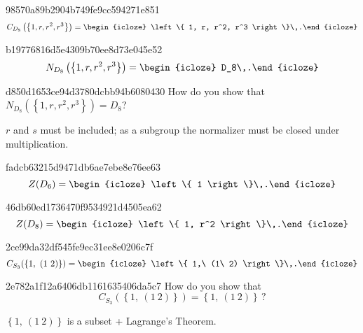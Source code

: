 \begin{note}{98570a89b2904b749fe9cc594271e851}
    \[
        C_{D_8}\left( \left\{ 1, r, r^2, r^3 \right\} \right) = \begin{icloze}{1}\left\{ 1, r, r^2, r^3 \right\}\,.\end{icloze}
    \]
\end{note}

\begin{note}{b19776816d5e4309b70ee8d73e045e52}
    \[
        N_{D_8}\left( \left\{ 1, r, r^2, r^3 \right\} \right) = \begin{icloze}{1}D_8\,.\end{icloze}
    \]
\end{note}

\begin{note}{d850d1653ce94d3780dcbb94b6080430}
    How do you show that \({ N_{D_8}\left( \left\{ 1, r, r^2, r^3 \right\} \right) = D_8 }\)?

    \begin{cloze}{1}
        \({ r }\) and \({ s }\) must be included; as a subgroup the normalizer must be closed under multiplication.
    \end{cloze}
\end{note}

\begin{note}{fadcb63215d9471db6ae7ebe8e76ee63}
    \[
        Z(D_6) = \begin{icloze}{1}\left\{ 1 \right\}\,.\end{icloze}
    \]
\end{note}

\begin{note}{46db60ed1736470f9534921d4505ea62}
    \[
        Z(D_8) = \begin{icloze}{1}\left\{ 1, r^2 \right\}\,.\end{icloze}
    \]
\end{note}

\begin{note}{2ce99da32df545fe9ec31ee8e0206c7f}
    \[
        C_{S_3}(\left\{ 1,\ (1\ 2) \right\}) = \begin{icloze}{1}\left\{ 1,\ (1\ 2) \right\}\,.\end{icloze}
    \]
\end{note}

\begin{note}{2e782a1f12a6406db1161635406da5c7}
    How do you show that
    \[
        C_{S_3}(\left\{ 1,\ (1\ 2) \right\}) = \left\{ 1,\ (1\ 2) \right\}\,?
    \]

    \begin{cloze}{1}
        \({ \left\{ 1,\ (1\ 2) \right\} }\) is a subset + Lagrange's Theorem.
    \end{cloze}
\end{note}

